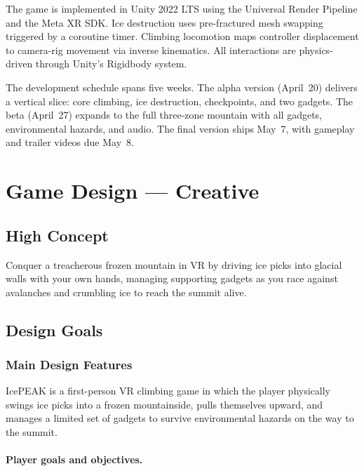 \documentclass[12pt]{article}
\begin{document}
The game is implemented in Unity 2022 LTS using the Universal Render Pipeline and the Meta XR SDK. Ice destruction uses pre-fractured mesh swapping triggered by a coroutine timer. Climbing locomotion maps controller displacement to camera-rig movement via inverse kinematics. All interactions are physics-driven through Unity's Rigidbody system.

The development schedule spans five weeks. The alpha version (April~20) delivers a vertical slice: core climbing, ice destruction, checkpoints, and two gadgets. The beta (April~27) expands to the full three-zone mountain with all gadgets, environmental hazards, and audio. The final version ships May~7, with gameplay and trailer videos due May~8.

\newpage

\section{Game Design --- Creative}

\subsection{High Concept}
Conquer a treacherous frozen mountain in VR by driving ice picks into glacial walls with your own hands, managing supporting gadgets as you race against avalanches and crumbling ice to reach the summit alive.

\subsection{Design Goals}

\subsubsection{Main Design Features}

IcePEAK is a first-person VR climbing game in which the player physically swings ice picks into a frozen mountainside, pulls themselves upward, and manages a limited set of gadgets to survive environmental hazards on the way to the summit.

\paragraph{Player goals and objectives.}
\end{document}
